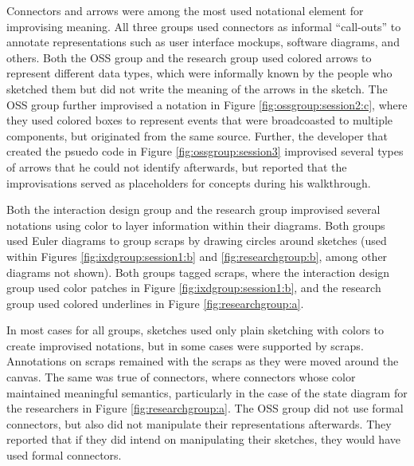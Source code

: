 Connectors and arrows were among the most used notational element for improvising meaning. All three groups used connectors as informal ``call-outs'' to annotate representations such as user interface mockups, software diagrams, and others. Both the OSS group and the research group used colored arrows to represent different data types, which were informally known by the people who sketched them but did not write the meaning of the arrows in the sketch. The OSS group further improvised a notation in Figure \ref{fig:ossgroup:session2:c}, where they used colored boxes to represent events that were broadcoasted to multiple components, but originated from the same source. Further, the developer that created the psuedo code in Figure \ref{fig:ossgroup:session3} improvised several types of arrows that he could not identify afterwards, but reported that the improvisations served as placeholders for concepts during his walkthrough.

Both the interaction design group and the research group improvised several notations using color to layer information within their diagrams. Both groups used Euler diagrams to group scraps by drawing circles around sketches (used within Figures \ref{fig:ixdgroup:session1:b} and \ref{fig:researchgroup:b}, among other diagrams not shown). Both groups tagged scraps, where the interaction design group used color patches in Figure \ref{fig:ixdgroup:session1:b}, and the research group used colored underlines in Figure \ref{fig:researchgroup:a}.

In most cases for all groups, sketches used only plain sketching with colors to create improvised notations, but in some cases were supported by scraps. Annotations on scraps remained with the scraps as they were moved around the canvas. The same was true of connectors, where connectors whose color maintained meaningful semantics, particularly in the case of the state diagram for the researchers in Figure \ref{fig:researchgroup:a}. The OSS group did not use formal connectors, but also did not manipulate their representations afterwards. They reported that if they did intend on manipulating their sketches, they would have used formal connectors.


%

